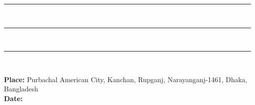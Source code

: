 \vspace{2\baselineskip}
\begin{flushleft}

\noindent
\begin{minipage}[t]{0.48\textwidth}
\centering
\hrule
\vspace{0.5\baselineskip}
{\bf \Supervisor \\ \SupervisorPosition} \par
{}
\end{minipage}
\hfill
\begin{minipage}[t]{0.48\textwidth}
\centering
\hrule
\vspace{0.5\baselineskip}
{\bf \secondSupervisor \\ \secondSupervisorPosition} \par
{}
\end{minipage}


\end{flushleft}
\vspace{2\baselineskip}
\begin{flushleft}
\begin{minipage}[c]{0.63\textwidth}
\centering
\hrule 
\vspace{0.5\baselineskip}
{\bf \HodName\\ \HodPosition} \par
{}
\end{minipage}
\end{flushleft}
\vspace{\baselineskip}

\noindent
{\bf Place:} Purbachal American City, Kanchan, Rupganj, Narayanganj-1461, Dhaka, Bangladesh \\
{\bf Date:} \reportSubmissionDate
